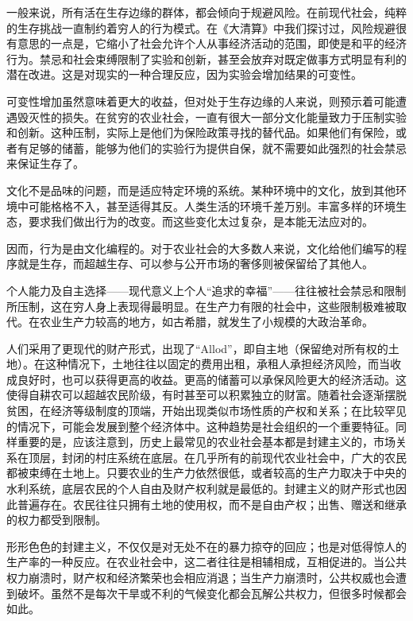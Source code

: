 一般来说，所有活在生存边缘的群体，都会倾向于规避风险。在前现代社会，纯粹的生存挑战一直制约着穷人的行为模式。在《大清算》中我们探讨过，风险规避很有意思的一点是，它缩小了社会允许个人从事经济活动的范围，即使是和平的经济行为。禁忌和社会束缚限制了实验和创新，甚至会放弃对既定做事方式明显有利的潜在改进。这是对现实的一种合理反应，因为实验会增加结果的可变性。

可变性增加虽然意味着更大的收益，但对处于生存边缘的人来说，则预示着可能遭遇毁灭性的损失。在贫穷的农业社会，一直有很大一部分文化能量致力于压制实验和创新。这种压制，实际上是他们为保险政策寻找的替代品。如果他们有保险，或者有足够的储蓄，能够为他们的实验行为提供自保，就不需要如此强烈的社会禁忌来保证生存了。

文化不是品味的问题，而是适应特定环境的系统。某种环境中的文化，放到其他环境中可能格格不入，甚至适得其反。人类生活的环境千差万别。丰富多样的环境生态，要求我们做出行为的改变。而这些变化太过复杂，是本能无法应对的。

因而，行为是由文化编程的。对于农业社会的大多数人来说，文化给他们编写的程序就是生存，而超越生存、可以参与公开市场的奢侈则被保留给了其他人。

个人能力及自主选择——现代意义上个人“追求的幸福”——往往被社会禁忌和限制所压制，这在穷人身上表现得最明显。在生产力有限的社会中，这些限制极难被取代。在农业生产力较高的地方，如古希腊，就发生了小规模的大政治革命。

人们采用了更现代的财产形式，出现了“Allod”，即自主地（保留绝对所有权的土地）。在这种情况下，土地往往以固定的费用出租，承租人承担经济风险，而当收成良好时，也可以获得更高的收益。更高的储蓄可以承保风险更大的经济活动。这使得自耕农可以超越农民阶级，有时甚至可以积累独立的财富。随着社会逐渐摆脱贫困，在经济等级制度的顶端，开始出现类似市场性质的产权和关系；在比较罕见的情况下，可能会发展到整个经济体中。这种趋势是社会组织的一个重要特征。同样重要的是，应该注意到，历史上最常见的农业社会基本都是封建主义的，市场关系在顶层，封闭的村庄系统在底层。在几乎所有的前现代农业社会中，广大的农民都被束缚在土地上。只要农业的生产力依然很低，或者较高的生产力取决于中央的水利系统，底层农民的个人自由及财产权利就是最低的。封建主义的财产形式也因此普遍存在。农民往往只拥有土地的使用权，而不是自由产权；出售、赠送和继承的权力都受到限制。

形形色色的封建主义，不仅仅是对无处不在的暴力掠夺的回应；也是对低得惊人的生产率的一种反应。在农业社会中，这二者往往是相辅相成，互相促进的。当公共权力崩溃时，财产权和经济繁荣也会相应消退；当生产力崩溃时，公共权威也会遭到破坏。虽然不是每次干旱或不利的气候变化都会瓦解公共权力，但很多时候都会如此。

